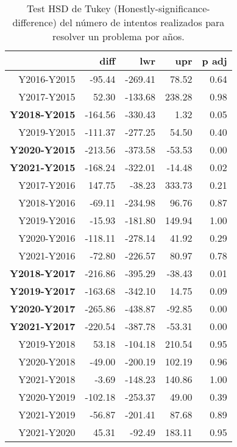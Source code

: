 \begin{table}[H]
\centering
\caption{Test HSD de Tukey (Honestly-significance-difference) del número de intentos realizados para resolver un problema por años.}
\label{tab:Tukeysessionsbefore}
\begin{tabular}{rrrrr}
  \hline
 & diff & lwr & upr & p adj \\ 
  \hline
Y2016-Y2015 & -95.44 & -269.41 & 78.52 & 0.64 \\ 
  Y2017-Y2015 & 52.30 & -133.68 & 238.28 & 0.98 \\ 
  \textbf{Y2018-Y2015} & -164.56 & -330.43 & 1.32 & 0.05 \\ 
  Y2019-Y2015 & -111.37 & -277.25 & 54.50 & 0.40 \\ 
  \textbf{Y2020-Y2015} & -213.56 & -373.58 & -53.53 & 0.00 \\ 
  \textbf{Y2021-Y2015} & -168.24 & -322.01 & -14.48 & 0.02 \\ 
  Y2017-Y2016 & 147.75 & -38.23 & 333.73 & 0.21 \\ 
  Y2018-Y2016 & -69.11 & -234.98 & 96.76 & 0.87 \\ 
  Y2019-Y2016 & -15.93 & -181.80 & 149.94 & 1.00 \\ 
  Y2020-Y2016 & -118.11 & -278.14 & 41.92 & 0.29 \\ 
  Y2021-Y2016 & -72.80 & -226.57 & 80.97 & 0.78 \\ 
  \textbf{Y2018-Y2017} & -216.86 & -395.29 & -38.43 & 0.01 \\ 
  \textbf{Y2019-Y2017} & -163.68 & -342.10 & 14.75 & 0.09 \\ 
  \textbf{Y2020-Y2017} & -265.86 & -438.87 & -92.85 & 0.00 \\ 
  \textbf{Y2021-Y2017} & -220.54 & -387.78 & -53.31 & 0.00 \\ 
  Y2019-Y2018 & 53.18 & -104.18 & 210.54 & 0.95 \\ 
  Y2020-Y2018 & -49.00 & -200.19 & 102.19 & 0.96 \\ 
  Y2021-Y2018 & -3.69 & -148.23 & 140.86 & 1.00 \\ 
  Y2020-Y2019 & -102.18 & -253.37 & 49.00 & 0.39 \\ 
  Y2021-Y2019 & -56.87 & -201.41 & 87.68 & 0.89 \\ 
  Y2021-Y2020 & 45.31 & -92.49 & 183.11 & 0.95 \\ 
   \hline
\end{tabular}
\end{table}


